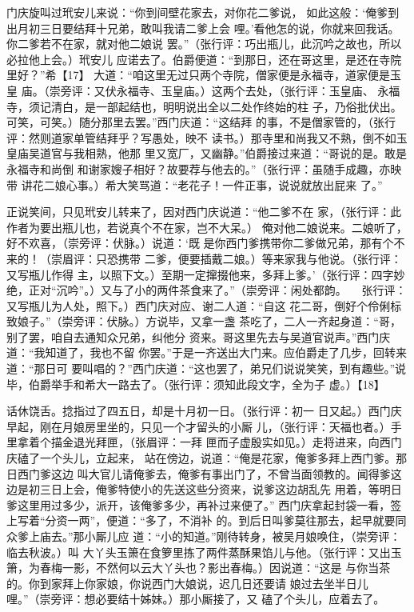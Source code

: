 \documentclass[UTF8,scheme=chinese,11pt,linespread=1.4]{ctexbook}
\makeatletter
\newenvironment{diben}[1]
  {\list{}{\listparindent 2em
    \itemindent\listparindent
    \rightmargin 0em  %
    \leftmargin 0em  %
    \parsep \z@ \@plus\p@}%
   \item\relax}
  {\endlist}
\makeatother
\begin{document}
\begin{diben}
西门庆旋叫过玳安儿来说：“你到间壁花家去，对你花二爹说，
如此这般：‘俺爹到出月初三日要结拜十兄弟，敢叫我请二爹上会
哩。’看他怎的说，你就来回我话。你二爹若不在家，就对他二娘说
罢。”（张行评：巧出瓶儿，此沉吟之故也，所以必拉他上会。）玳安儿
应诺去了。伯爵便道：“到那日，还在哥这里，是还在寺院里好？”希【17】
大道：“咱这里无过只两个寺院，僧家便是永福寺，道家便是玉皇
庙。（崇旁评：又伏永福寺、玉皇庙。）这两个去处，（张行评：玉皇庙、
永福寺，须记清白，是一部起结也，明明说出全以二处作终始的柱
子，乃俗批伏出。可笑，可笑。）随分那里去罢。”西门庆道：“这结拜
的事，不是僧家管的，（张行评：然则道家单管结拜乎？写愚处，映不
读书。）那寺里和尚我又不熟，倒不如玉皇庙吴道官与我相熟，他那
里又宽厂，又幽静。”伯爵接过来道：“哥说的是。敢是永福寺和尚倒
和谢家嫂子相好？故要荐与他去的。”（张行评：虽随手成趣，亦映带
讲花二娘心事。）希大笑骂道：“老花子！一件正事，说说就放出屁来
了。”

正说笑间，只见玳安儿转来了，因对西门庆说道：“他二爹不在
家，（张行评：此作者为要出瓶儿也，若说真个不在家，岂不大呆。）
俺对他二娘说来。二娘听了，好不欢喜，（崇旁评：伏脉。）说道：‘既
是你西门爹携带你二爹做兄弟，那有个不来的！（崇眉评：只恐携带
二爹，便要插戴二娘。）等来家我与他说。（张行评：又写瓶儿作得
主，以照下文。）至期一定撺掇他来，多拜上爹。’（张行评：四字妙
绝，正对“沉吟”。）又与了小的两件茶食来了。”（崇旁评：闲处都韵。
　张行评：又写瓶儿为人处，照下。）西门庆对应、谢二人道：“自这
花二哥，倒好个伶俐标致娘子。”（崇旁评：伏脉。）方说毕，又拿一盏
茶吃了，二人一齐起身道：“哥，别了罢，咱自去通知众兄弟，纠他分
资来。哥这里先去与吴道官说声。”西门庆道：“我知道了，我也不留
你罢。”于是一齐送出大门来。应伯爵走了几步，回转来道：“那日可
要叫唱的？”西门庆道：“这也罢了，弟兄们说说笑笑，到有趣些。”说
毕，伯爵举手和希大一路去了。（张行评：须知此段文字，全为子
虚。）【18】

话休饶舌。捻指过了四五日，却是十月初一日。（张行评：初一
日又起。）西门庆早起，刚在月娘房里坐的，只见一个才留头的小厮
儿，（张行评：天福也者。）手里拿着个描金退光拜匣，（张眉评：一拜
匣而子虚殷实如见。）走将进来，向西门庆磕了一个头儿，立起来，
站在傍边，说道：“俺是花家，俺爹多拜上西门爹。那日西门爹这边
叫大官儿请俺爹去，俺爹有事出门了，不曾当面领教的。闻得爹这
边是初三日上会，俺爹特使小的先送这些分资来，说爹这边胡乱先
用着，等明日爹这里用过多少，派开，该俺爹多少，再补过来便了。”
西门庆拿起封袋一看，签上写着“分资一两”，便道：“多了，不消补
的。到后日叫爹莫往那去，起早就要同众爹上庙去。”那小厮儿应
道：“小的知道。”刚待转身，被吴月娘唤住，（崇旁评：临去秋波。）叫
大丫头玉箫在食箩里拣了两件蒸酥果馅儿与他。（张行评：又出玉
箫，为春梅一影，不然何以云大丫头也？影出春梅。）因说道：“这是
与你当茶的。你到家拜上你家娘，你说西门大娘说，迟几日还要请
娘过去坐半日儿哩。”（崇旁评：想必要结十姊妹。）那小厮接了，又
磕了个头儿，应着去了。


\end{diben}
\end{document}
